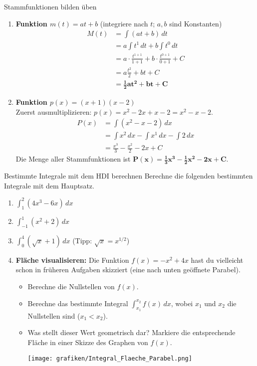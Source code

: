 \begin{loesungsumgebung}{Stammfunktionen bilden üben}
\begin{enumerate}[label=(\alph*)]
    \item \textbf{Funktion $m(t) = at+b$} (integriere nach $t$; $a,b$ sind Konstanten)
    \begin{align*} M(t) &= \int (at+b) \, dt \\ &= a \int t^1 \, dt + b \int t^0 \, dt \\ &= a \cdot \frac{t^{1+1}}{1+1} + b \cdot \frac{t^{0+1}}{0+1} + C \\ &= a \frac{t^2}{2} + b t + C \\ &= \mathbf{\frac{1}{2}at^2 + bt + C} \end{align*}

    \item \textbf{Funktion $p(x) = (x+1)(x-2)$} \\
    Zuerst ausmultiplizieren: $p(x) = x^2 - 2x + x - 2 = x^2 - x - 2$.
    \begin{align*} P(x) &= \int (x^2 - x - 2) \, dx \\ &= \int x^2 \, dx - \int x^1 \, dx - \int 2 \, dx \\ &= \frac{x^3}{3} - \frac{x^2}{2} - 2x + C \end{align*}
    Die Menge aller Stammfunktionen ist $\mathbf{P(x) = \frac{1}{3}x^3 - \frac{1}{2}x^2 - 2x + C}$.
\end{enumerate}

\end{loesungsumgebung}



\begin{aufgabenumgebung}{Bestimmte Integrale mit dem HDI berechnen}
Berechne die folgenden bestimmten Integrale mit dem Hauptsatz.
\begin{enumerate}
    \item $\int_{1}^{2} (4x^3 - 6x) \,dx$
    \item $\int_{-1}^{1} (x^2 + 2) \,dx$
    \item $\int_{0}^{4} (\sqrt{x} + 1) \,dx$ (Tipp: $\sqrt{x} = x^{1/2}$)
    \item \textbf{Fläche visualisieren:}
        Die Funktion $f(x) = -x^2 + 4x$ hast du vielleicht schon in früheren Aufgaben skizziert (eine nach unten geöffnete Parabel).
        \begin{itemize}
            \item Berechne die Nullstellen von $f(x)$.
            \item Berechne das bestimmte Integral $\int_{x_1}^{x_2} f(x) \,dx$, wobei $x_1$ und $x_2$ die Nullstellen sind ($x_1 < x_2$).
            \item Was stellt dieser Wert geometrisch dar? Markiere die entsprechende Fläche in einer Skizze des Graphen von $f(x)$.
\begin{center}
    \texttt{[image: grafiken/Integral\_Flaeche\_Parabel.png]}
    \label{fig:flaeche_parabel}
\end{center}
        \end{itemize}
\end{enumerate}
\end{aufgabenumgebung}


